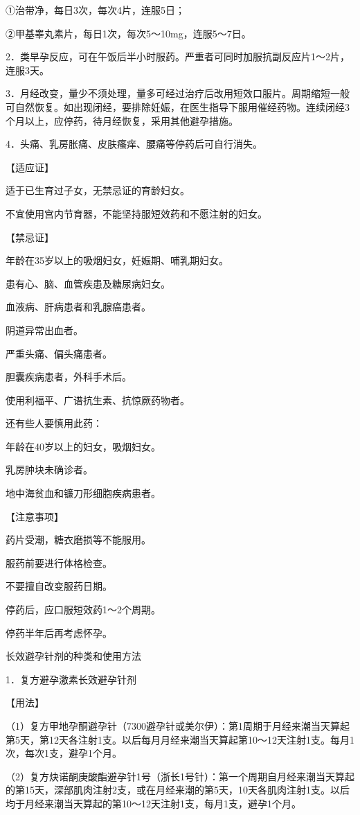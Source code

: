 \documentclass[12pt,UTF8]{ctexbook}
\begin{document}
①治带净，每日3次，每次4片，连服5日；

②甲基睾丸素片，每日1次，每次5～10mg，连服5～7日。

2．类早孕反应，可在午饭后半小时服药。严重者可同时加服抗副反应片1～2片，连服3天。

3．月经改变，量少不须处理，量多可经过治疗后改用短效口服片。周期缩短一般可自然恢复。如出现闭经，要排除妊娠，在医生指导下服用催经药物。连续闭经3个月以上，应停药，待月经恢复，采用其他避孕措施。

4．头痛、乳房胀痛、皮肤瘙痒、腰痛等停药后可自行消失。

【适应证】

适于已生育过子女，无禁忌证的育龄妇女。

不宜使用宫内节育器，不能坚持服短效药和不愿注射的妇女。

【禁忌证】

年龄在35岁以上的吸烟妇女，妊娠期、哺乳期妇女。

患有心、脑、血管疾患及糖尿病妇女。

血液病、肝病患者和乳腺癌患者。

阴道异常出血者。

严重头痛、偏头痛患者。

胆囊疾病患者，外科手术后。

使用利福平、广谱抗生素、抗惊厥药物者。

还有些人要慎用此药：

年龄在40岁以上的妇女，吸烟妇女。

乳房肿块未确诊者。

地中海贫血和镰刀形细胞疾病患者。

【注意事项】

药片受潮，糖衣磨损等不能服用。

服药前要进行体格检查。

不要擅自改变服药日期。

停药后，应口服短效药1～2个周期。

停药半年后再考虑怀孕。





长效避孕针剂的种类和使用方法


1．复方避孕激素长效避孕针剂

【用法】

（1）复方甲地孕酮避孕针（7300避孕针或美尔伊）：第1周期于月经来潮当天算起第5天，第12天各注射1支。以后每月月经来潮当天算起第10～12天注射1支。每月1次，每次1支，避孕1个月。

（2）复方炔诺酮庚酸酯避孕针1号（浙长1号针）：第一个周期自月经来潮当天算起的第15天，深部肌肉注射2支，或在月经来潮的第5天，10天各肌肉注射1支。以后均于月经来潮当天算起的第10～12天注射1支，每月1支，避孕1个月。
\end{document}
